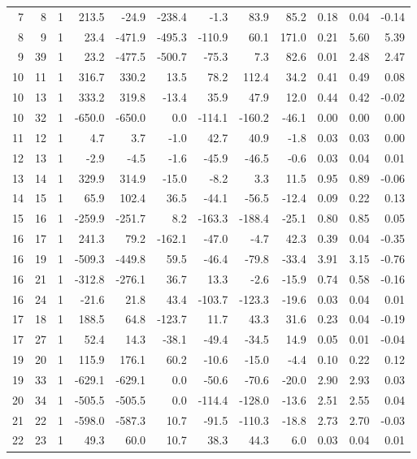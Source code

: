 \documentclass[12pt]{classe_uftex/uftex}
\begin{document}
\begin{landscape}
\begin{longtable}{rrcrrrrrrrrr}
7 & 8 & 1 & 213.5 & -24.9 & -238.4 & -1.3 & 83.9 & 85.2 & 0.18 & 0.04 & -0.14 \\
8 & 9 & 1 & 23.4 & -471.9 & -495.3 & -110.9 & 60.1 & 171.0 & 0.21 & 5.60 & 5.39 \\
9 & 39 & 1 & 23.2 & -477.5 & -500.7 & -75.3 & 7.3 & 82.6 & 0.01 & 2.48 & 2.47 \\
10 & 11 & 1 & 316.7 & 330.2 & 13.5 & 78.2 & 112.4 & 34.2 & 0.41 & 0.49 & 0.08 \\
10 & 13 & 1 & 333.2 & 319.8 & -13.4 & 35.9 & 47.9 & 12.0 & 0.44 & 0.42 & -0.02 \\
10 & 32 & 1 & -650.0 & -650.0 & 0.0 & -114.1 & -160.2 & -46.1 & 0.00 & 0.00 & 0.00 \\
11 & 12 & 1 & 4.7 & 3.7 & -1.0 & 42.7 & 40.9 & -1.8 & 0.03 & 0.03 & 0.00 \\
12 & 13 & 1 & -2.9 & -4.5 & -1.6 & -45.9 & -46.5 & -0.6 & 0.03 & 0.04 & 0.01 \\
13 & 14 & 1 & 329.9 & 314.9 & -15.0 & -8.2 & 3.3 & 11.5 & 0.95 & 0.89 & -0.06 \\
14 & 15 & 1 & 65.9 & 102.4 & 36.5 & -44.1 & -56.5 & -12.4 & 0.09 & 0.22 & 0.13 \\
15 & 16 & 1 & -259.9 & -251.7 & 8.2 & -163.3 & -188.4 & -25.1 & 0.80 & 0.85 & 0.05 \\
16 & 17 & 1 & 241.3 & 79.2 & -162.1 & -47.0 & -4.7 & 42.3 & 0.39 & 0.04 & -0.35 \\
16 & 19 & 1 & -509.3 & -449.8 & 59.5 & -46.4 & -79.8 & -33.4 & 3.91 & 3.15 & -0.76 \\
16 & 21 & 1 & -312.8 & -276.1 & 36.7 & 13.3 & -2.6 & -15.9 & 0.74 & 0.58 & -0.16 \\
16 & 24 & 1 & -21.6 & 21.8 & 43.4 & -103.7 & -123.3 & -19.6 & 0.03 & 0.04 & 0.01 \\
17 & 18 & 1 & 188.5 & 64.8 & -123.7 & 11.7 & 43.3 & 31.6 & 0.23 & 0.04 & -0.19 \\
17 & 27 & 1 & 52.4 & 14.3 & -38.1 & -49.4 & -34.5 & 14.9 & 0.05 & 0.01 & -0.04 \\
19 & 20 & 1 & 115.9 & 176.1 & 60.2 & -10.6 & -15.0 & -4.4 & 0.10 & 0.22 & 0.12 \\
19 & 33 & 1 & -629.1 & -629.1 & 0.0 & -50.6 & -70.6 & -20.0 & 2.90 & 2.93 & 0.03 \\
20 & 34 & 1 & -505.5 & -505.5 & 0.0 & -114.4 & -128.0 & -13.6 & 2.51 & 2.55 & 0.04 \\
21 & 22 & 1 & -598.0 & -587.3 & 10.7 & -91.5 & -110.3 & -18.8 & 2.73 & 2.70 & -0.03 \\
22 & 23 & 1 & 49.3 & 60.0 & 10.7 & 38.3 & 44.3 & 6.0 & 0.03 & 0.04 & 0.01 \\

\end{longtable}
\end{landscape}
\end{document}
